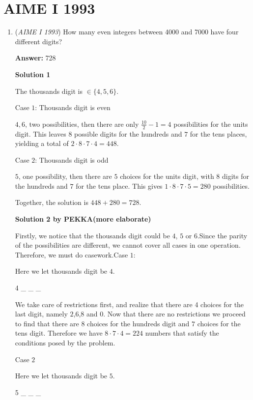 \section{AIME I 1993}
        \begin{enumerate}
        	\item (\textit{AIME I 1993}) How many even integers between 4000 and 7000 have four different digits? 


 
 \textbf{Answer: }728



\textbf{Solution 1}

The thousands digit is $\in \{4,5,6\}$. 

 Case $1$: Thousands digit is even

 $4, 6$, two possibilities, then there are only $\frac{10}{2} - 1 = 4$ possibilities for the units digit. This leaves $8$ possible digits for the hundreds and $7$ for the tens places, yielding a total of $2 \cdot 8 \cdot 7 \cdot 4 = 448$.

 
Case $2$: Thousands digit is odd

 $5$, one possibility, then there are $5$ choices for the units digit, with $8$ digits for the hundreds and $7$ for the tens place. This gives $1 \cdot 8 \cdot 7 \cdot 5= 280$ possibilities.

 Together, the solution is $448 + 280 = \boxed{728}$.

 



\textbf{Solution 2 by PEKKA(more elaborate)}

Firstly, we notice that the thousands digit could be $4$, $5$ or $6$.Since the parity of the possibilities are different, we cannot cover all cases in one operation. Therefore, we must do casework.Case $1$: 

 Here we let thousands digit be $4$.

 4 \_ \_ \_ 

 We take care of restrictions first, and realize that there are 4 choices for the last digit, namely $2$,$6$,$8$ and $0$. Now that there are no restrictions we proceed to find that there are $8$ choices for the hundreds digit and $7$ choices for the tens digit. Therefore we have $8 \cdot 7 \cdot 4 = 224$ numbers that satisfy the conditions posed by the problem.

 Case $2$

 Here we let thousands digit be $5$.

 5 \_ \_ \_ 


\end{enumerate}
